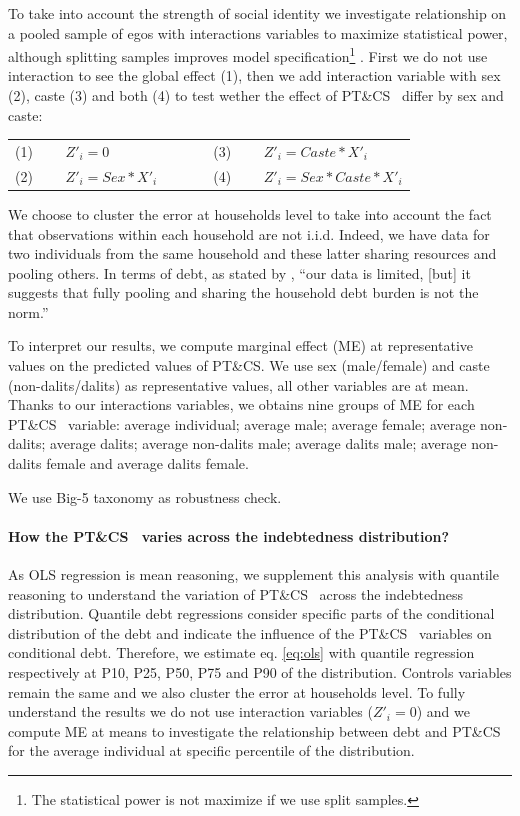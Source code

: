 \documentclass[a4paper, 11pt, onecolumn]{article}
\newcommand{\PTCS}{PT\&CS}
\begin{document}
To take into account the strength of social identity we investigate relationship on a pooled sample of egos with interactions variables to maximize statistical power, although splitting samples improves model specification\footnote{The statistical power is not maximize if we use split samples.} .
First we do not use interaction to see the global effect (1), then we add interaction variable with sex (2), caste (3) and both (4) to test wether the effect of \PTCS~ differ by sex and caste:

\begin{table}[h!]
  \centering
    \begin{tabular}{lllll}
    (1)~~~~ $Z'_{i}=0$ & & & & (3)~~~~ $Z'_{i}=Caste*X'_{i}$ \\
    (2)~~~~ $Z'_{i}=Sex*X'_{i}$ & & & & (4)~~~~ $Z'_{i}=Sex*Caste*X'_{i}$ \\
    \end{tabular}%
\end{table}%

We choose to cluster the error at households level to take into account the fact that observations within each household are not i.i.d.
Indeed, we have data for two individuals from the same household and these latter sharing resources and pooling others.%
In terms of debt, as stated by \cite{Reboul2021}, ``our data is limited, [but] it suggests that fully pooling and sharing the household debt burden is not the norm.''

To interpret our results, we compute marginal effect (ME) at representative values on the predicted values of \PTCS.%
We use sex (male/female) and caste (non-dalits/dalits) as representative values, all other variables are at mean.
Thanks to our interactions variables, we obtains nine groups of ME for each \PTCS~ variable: average individual; average male; average female; average non-dalits; average dalits; average non-dalits male; average dalits male; average non-dalits female and average dalits female. 

We use Big-5 taxonomy as robustness check.

\paragraph{How the \PTCS~ varies across the indebtedness distribution?}
As OLS regression is mean reasoning, we supplement this analysis with quantile reasoning to understand the variation of \PTCS~ across the indebtedness distribution.
Quantile debt regressions consider specific parts of the conditional distribution of the debt and indicate the influence of the \PTCS~ variables on conditional debt.
Therefore, we estimate eq. \ref{eq:ols} with quantile regression respectively at P10, P25, P50, P75 and P90 of the distribution.
Controls variables remain the same and we also cluster the error at households level.
To fully understand the results we do not use interaction variables ($Z'_{i}=0$) and we compute ME at means to investigate the relationship between debt and \PTCS~ for the average individual at specific percentile of the distribution.
\end{document}
